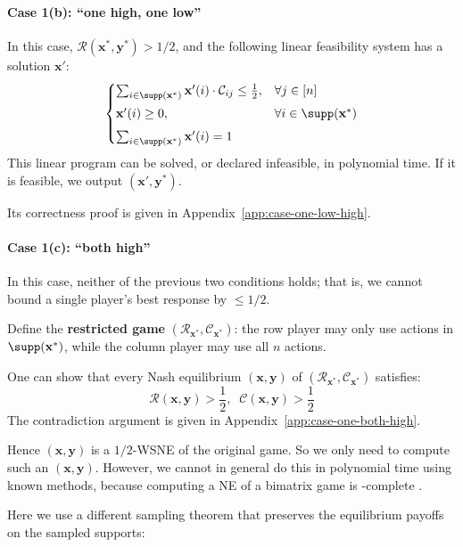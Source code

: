 \paragraph{Case 1(b): ``one high, one low''}
In this case, \(\mathcal{R}(\mathbf{x}^*, \mathbf{y}^*) > 1/2\), and the following linear feasibility system has a solution \(\mathbf{x}'\):
\[
  \begin{cases}
    \sum_{i \in \supp(\mathbf{x}^*)} \mathbf{x}'(i) \cdot \mathcal{C}_{ij} \le \frac12, & \forall j \in [n]                 \\[4pt]
    \mathbf{x}'(i) \ge 0,                                                               & \forall i \in \supp(\mathbf{x}^*) \\[4pt]
    \sum_{i \in \supp(\mathbf{x}^*)} \mathbf{x}'(i) = 1
  \end{cases}
\]
This linear program can be solved, or declared infeasible, in polynomial time.
If it is feasible, we output \((\mathbf{x}', \mathbf{y}^*)\).

Its correctness proof is given in Appendix~\ref{app:case-one-low-high}.

\paragraph{Case 1(c): ``both high''}
In this case, neither of the previous two conditions holds; that is, we cannot bound a single player's best response by \(\le 1/2\).

Define the \textbf{restricted game} \((\mathcal{R}_{\mathbf{x}^*}, \mathcal{C}_{\mathbf{x}^*})\): the row player may only use actions in \(\supp(\mathbf{x}^*)\), while the column player may use all \(n\) actions.

One can show that every Nash equilibrium \((\mathbf{x}, \mathbf{y})\) of \((\mathcal{R}_{\mathbf{x}^*}, \mathcal{C}_{\mathbf{x}^*})\) satisfies:
\[
  \mathcal{R}(\mathbf{x}, \mathbf{y}) > \frac12,\;\; \mathcal{C}(\mathbf{x}, \mathbf{y}) > \frac12
\]
The contradiction argument is given in Appendix~\ref{app:case-one-both-high}.

Hence \((\mathbf{x}, \mathbf{y})\) is a \(1/2\)-WSNE of the original game. So we only need to compute such an \((\mathbf{x}, \mathbf{y})\). However, we cannot in general do this in polynomial time using known methods, because computing a NE of a bimatrix game is \PPAD-complete \cite{DGP09}.

Here we use a different sampling theorem that preserves the equilibrium payoffs on the sampled supports:

